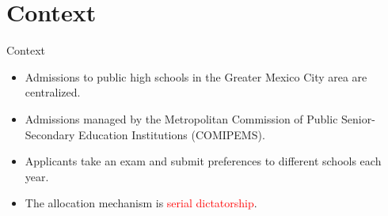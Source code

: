 \documentclass[notes,11pt, aspectratio=169]{beamer}
\begin{document}



\section{Context}


\begin{frame}[fragile]{Context}
  \begin{itemize}
    \vfill\item Admissions to public high schools in the Greater Mexico City area are centralized.
    \vfill\item Admissions managed by the Metropolitan Commission of Public Senior-Secondary Education Institutions (COMIPEMS).
    \vfill\item Applicants take an exam and submit preferences to different schools each year. 
    \vfill\item The allocation mechanism is \textcolor{red}{serial dictatorship}. 
  \end{itemize}
\end{frame}
\end{document}
